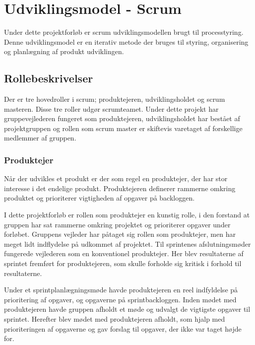 \chapter{Udviklingsmodel - Scrum}
Under dette projektforløb er scrum udviklingsmodellen brugt til processtyring. Denne udviklingsmodel er en iterativ metode der bruges til styring, organisering og planlægning af produkt udviklingen.


\section{Rollebeskrivelser}
Der er tre hovedroller i scrum; produktejeren, udviklingsholdet og scrum masteren. Disse tre roller udgør scrumteamet. Under dette projekt har gruppevejlederen fungeret som produktejeren, udviklingsholdet har bestået af projektgruppen og rollen som scrum master er skiftevis varetaget af forskellige medlemmer af gruppen.

\subsection{Produktejer}
Når der udvikles et produkt er der som regel en produktejer, der har stor interesse i det endelige produkt. Produktejeren definerer rammerne omkring produktet og prioriterer vigtigheden af opgaver på backloggen. \newline

I dette projektforløb er rollen som produktejer en kunstig rolle, i den forstand at gruppen har sat rammerne omkring projektet og prioriterer opgaver under forløbet. Gruppens vejleder har påtaget sig rollen som produktejer, men har meget lidt indflydelse på udkommet af projektet. Til sprintenes afslutningsmøder fungerede vejlederen som en konventionel produktejer. Her blev resultaterne af sprintet fremført for produktejeren, som skulle forholde sig kritisk i forhold til resultaterne.

Under et sprintplanlægningsmøde havde produktejeren en reel indfyldelse på prioritering af opgaver, og opgaverne på sprintbackloggen. Inden mødet med produktejeren havde gruppen afholdt et møde og udvalgt de vigtigste opgaver til sprintet. Herefter blev mødet med produktejeren afholdt, som hjalp med prioriteringen af opgaverne og gav forslag til opgaver, der ikke var taget højde for.  

